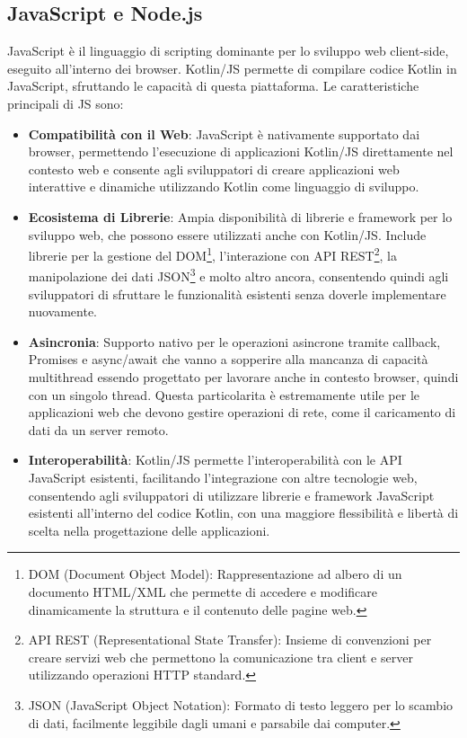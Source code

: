 \documentclass[12pt,a4paper,openright,twoside]{book}
\begin{document}
\subsection{JavaScript e Node.js}

JavaScript è il linguaggio di scripting dominante per lo sviluppo web client-side, eseguito all'interno dei browser. Kotlin/\ac{JS} permette di compilare codice Kotlin in JavaScript, 
sfruttando le capacità di questa piattaforma. Le caratteristiche principali di \ac{JS} sono:

\begin{itemize}
\item \textbf{Compatibilità con il Web}: JavaScript è nativamente supportato dai browser, permettendo l'esecuzione di applicazioni Kotlin/\ac{JS} direttamente nel contesto web e 
consente agli sviluppatori di creare applicazioni web interattive e dinamiche utilizzando Kotlin come linguaggio di sviluppo.
\item \textbf{Ecosistema di Librerie}: Ampia disponibilità di librerie e framework per lo sviluppo web, che possono essere utilizzati anche con Kotlin/\ac{JS}. 
Include librerie per la gestione del DOM\footnote{
    DOM (Document Object Model): Rappresentazione ad albero di un documento HTML/XML che permette di accedere e modificare dinamicamente la struttura e 
    il contenuto delle pagine web.
}, l'interazione con API REST\footnote{
    API REST (Representational State Transfer): Insieme di convenzioni per creare servizi web che permettono la comunicazione 
    tra client e server utilizzando operazioni HTTP standard.
}, la manipolazione dei dati JSON\footnote{
    JSON (JavaScript Object Notation): Formato di testo leggero per lo scambio di dati, facilmente leggibile dagli umani e parsabile dai computer.
} 
e molto altro ancora, consentendo quindi agli sviluppatori di sfruttare le funzionalità esistenti senza doverle implementare nuovamente.
\item \textbf{Asincronia}: Supporto nativo per le operazioni asincrone tramite callback, Promises e async/await che vanno a sopperire alla mancanza di capacità multithread 
essendo progettato per lavorare anche in contesto browser, quindi con un singolo thread. Questa particolarita è estremamente utile per le applicazioni web che devono gestire 
operazioni di rete, come il caricamento di dati da un server remoto.
\item \textbf{Interoperabilità}: Kotlin/\ac{JS} permette l'interoperabilità con le API JavaScript esistenti, facilitando l'integrazione con altre tecnologie web,
consentendo agli sviluppatori di utilizzare librerie e framework JavaScript esistenti all'interno del codice Kotlin, con una maggiore flessibilità 
e libertà di scelta nella progettazione delle applicazioni.
\end{itemize}
\end{document}

